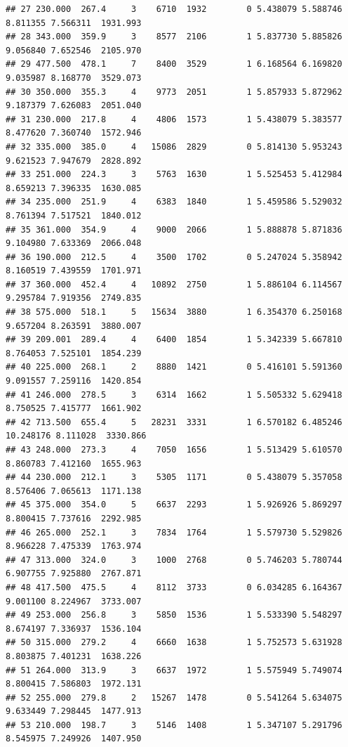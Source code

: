 \documentclass[
]{book}
\theoremstyle{definition}
\theoremstyle{definition}
\theoremstyle{definition}
\theoremstyle{definition}
\theoremstyle{remark}
\begin{document}
\begin{verbatim}
## 27 230.000  267.4     3    6710  1932        0 5.438079 5.588746  8.811355 7.566311  1931.993
## 28 343.000  359.9     3    8577  2106        1 5.837730 5.885826  9.056840 7.652546  2105.970
## 29 477.500  478.1     7    8400  3529        1 6.168564 6.169820  9.035987 8.168770  3529.073
## 30 350.000  355.3     4    9773  2051        1 5.857933 5.872962  9.187379 7.626083  2051.040
## 31 230.000  217.8     4    4806  1573        1 5.438079 5.383577  8.477620 7.360740  1572.946
## 32 335.000  385.0     4   15086  2829        0 5.814130 5.953243  9.621523 7.947679  2828.892
## 33 251.000  224.3     3    5763  1630        1 5.525453 5.412984  8.659213 7.396335  1630.085
## 34 235.000  251.9     4    6383  1840        1 5.459586 5.529032  8.761394 7.517521  1840.012
## 35 361.000  354.9     4    9000  2066        1 5.888878 5.871836  9.104980 7.633369  2066.048
## 36 190.000  212.5     4    3500  1702        0 5.247024 5.358942  8.160519 7.439559  1701.971
## 37 360.000  452.4     4   10892  2750        1 5.886104 6.114567  9.295784 7.919356  2749.835
## 38 575.000  518.1     5   15634  3880        1 6.354370 6.250168  9.657204 8.263591  3880.007
## 39 209.001  289.4     4    6400  1854        1 5.342339 5.667810  8.764053 7.525101  1854.239
## 40 225.000  268.1     2    8880  1421        0 5.416101 5.591360  9.091557 7.259116  1420.854
## 41 246.000  278.5     3    6314  1662        1 5.505332 5.629418  8.750525 7.415777  1661.902
## 42 713.500  655.4     5   28231  3331        1 6.570182 6.485246 10.248176 8.111028  3330.866
## 43 248.000  273.3     4    7050  1656        1 5.513429 5.610570  8.860783 7.412160  1655.963
## 44 230.000  212.1     3    5305  1171        0 5.438079 5.357058  8.576406 7.065613  1171.138
## 45 375.000  354.0     5    6637  2293        1 5.926926 5.869297  8.800415 7.737616  2292.985
## 46 265.000  252.1     3    7834  1764        1 5.579730 5.529826  8.966228 7.475339  1763.974
## 47 313.000  324.0     3    1000  2768        0 5.746203 5.780744  6.907755 7.925880  2767.871
## 48 417.500  475.5     4    8112  3733        0 6.034285 6.164367  9.001100 8.224967  3733.007
## 49 253.000  256.8     3    5850  1536        1 5.533390 5.548297  8.674197 7.336937  1536.104
## 50 315.000  279.2     4    6660  1638        1 5.752573 5.631928  8.803875 7.401231  1638.226
## 51 264.000  313.9     3    6637  1972        1 5.575949 5.749074  8.800415 7.586803  1972.131
## 52 255.000  279.8     2   15267  1478        0 5.541264 5.634075  9.633449 7.298445  1477.913
## 53 210.000  198.7     3    5146  1408        1 5.347107 5.291796  8.545975 7.249926  1407.950

\end{verbatim}
\end{document}

